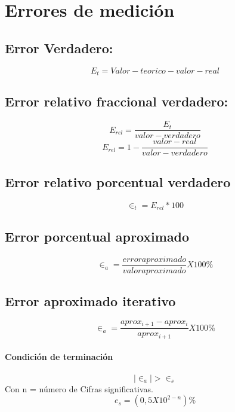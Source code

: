 \section{Errores de medición}

\subsection{Error Verdadero:}
$$
	 E_t = Valor-teorico - valor-real
$$
\subsection{Error relativo fraccional verdadero:}
$$ 
	  E_{rel} = \frac{E_t}{valor-verdadero}
$$
$$
	E_{rel} = 1 - \frac{valor-real}{valor-verdadero} 
$$
\subsection{Error relativo porcentual verdadero }
$$
	  \in_t= E_{rel}*100
$$
\subsection{Error porcentual aproximado}
$$
	\in_a = \frac{error aproximado}{valor aproximado} X 100 \%
$$
\subsection{ Error aproximado iterativo}
$$
\in_a = \frac{aprox_{i+1} - aprox_{i} }{aprox_{i+1}} X 100 \%
$$
\paragraph{ Condición de terminación}
$$
| \in_a | > \in_s
$$
Con n = número de Cifras significativas.
$$
	e_s = (0,5 X 10^{2-n}) \%
$$
